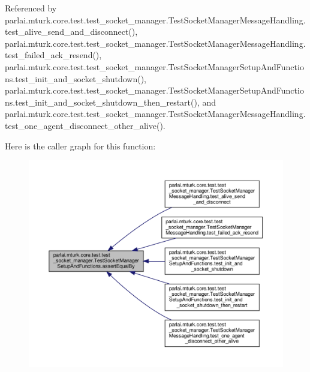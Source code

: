 Referenced by parlai.\+mturk.\+core.\+test.\+test\+\_\+socket\+\_\+manager.\+Test\+Socket\+Manager\+Message\+Handling.\+test\+\_\+alive\+\_\+send\+\_\+and\+\_\+disconnect(), parlai.\+mturk.\+core.\+test.\+test\+\_\+socket\+\_\+manager.\+Test\+Socket\+Manager\+Message\+Handling.\+test\+\_\+failed\+\_\+ack\+\_\+resend(), parlai.\+mturk.\+core.\+test.\+test\+\_\+socket\+\_\+manager.\+Test\+Socket\+Manager\+Setup\+And\+Functions.\+test\+\_\+init\+\_\+and\+\_\+socket\+\_\+shutdown(), parlai.\+mturk.\+core.\+test.\+test\+\_\+socket\+\_\+manager.\+Test\+Socket\+Manager\+Setup\+And\+Functions.\+test\+\_\+init\+\_\+and\+\_\+socket\+\_\+shutdown\+\_\+then\+\_\+restart(), and parlai.\+mturk.\+core.\+test.\+test\+\_\+socket\+\_\+manager.\+Test\+Socket\+Manager\+Message\+Handling.\+test\+\_\+one\+\_\+agent\+\_\+disconnect\+\_\+other\+\_\+alive().

Here is the caller graph for this function\+:
\nopagebreak
\begin{figure}[H]
\begin{center}
\leavevmode
\includegraphics[width=350pt]{classparlai_1_1mturk_1_1core_1_1test_1_1test__socket__manager_1_1TestSocketManagerSetupAndFunctions_a9bc007a9f1035e2491fb701d163edf0d_icgraph}
\end{center}
\end{figure}
\mbox{\label{classparlai_1_1mturk_1_1core_1_1test_1_1test__socket__manager_1_1TestSocketManagerSetupAndFunctions_a58c5e2c63f7b7728a69c0f364c5fc275}} 
